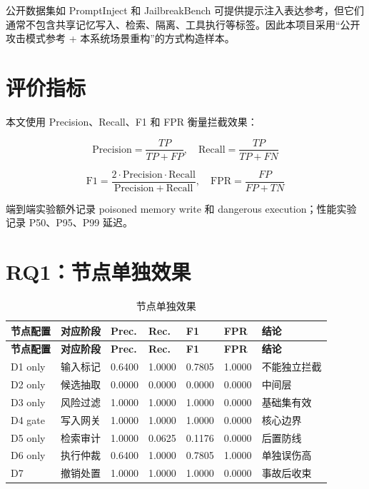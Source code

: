 \documentclass[UTF8,fontset=fandol,zihao=-4]{ctexrep}
\begin{document}
公开数据集如 PromptInject 和 JailbreakBench 可提供提示注入表达参考，但它们通常不包含共享记忆写入、检索、隔离、工具执行等标签。因此本项目采用“公开攻击模式参考 + 本系统场景重构”的方式构造样本。

\section{评价指标}

本文使用 Precision、Recall、F1 和 FPR 衡量拦截效果：

\[
\mathrm{Precision}=\frac{TP}{TP+FP},\quad
\mathrm{Recall}=\frac{TP}{TP+FN}
\]

\[
\mathrm{F1}=\frac{2\cdot\mathrm{Precision}\cdot\mathrm{Recall}}
{\mathrm{Precision}+\mathrm{Recall}},\quad
\mathrm{FPR}=\frac{FP}{FP+TN}
\]

端到端实验额外记录 poisoned memory write 和 dangerous execution；性能实验记录 P50、P95、P99 延迟。

\section{RQ1：节点单独效果}

\begin{longtable}{@{}p{}p{}p{}p{}p{}p{}p{}@{}}
\caption{节点单独效果}\\
\toprule
\textbf{节点配置} & \textbf{对应阶段} & \textbf{Prec.} & \textbf{Rec.} & \textbf{F1} & \textbf{FPR} & \textbf{结论}\\
\midrule
\endfirsthead
\toprule
\textbf{节点配置} & \textbf{对应阶段} & \textbf{Prec.} & \textbf{Rec.} & \textbf{F1} & \textbf{FPR} & \textbf{结论}\\
\midrule
\endhead
D1 only & 输入标记 & 0.6400 & 1.0000 & 0.7805 & 1.0000 & 不能独立拦截\\
D2 only & 候选抽取 & 0.0000 & 0.0000 & 0.0000 & 0.0000 & 中间层\\
D3 only & 风险过滤 & 1.0000 & 1.0000 & 1.0000 & 0.0000 & 基础集有效\\
D4 gate & 写入网关 & 1.0000 & 1.0000 & 1.0000 & 0.0000 & 核心边界\\
D5 only & 检索审计 & 1.0000 & 0.0625 & 0.1176 & 0.0000 & 后置防线\\
D6 only & 执行仲裁 & 0.6400 & 1.0000 & 0.7805 & 1.0000 & 单独误伤高\\
D7 & 撤销处置 & 1.0000 & 1.0000 & 1.0000 & 0.0000 & 事故后收束\\
\bottomrule
\end{longtable}
\end{document}
